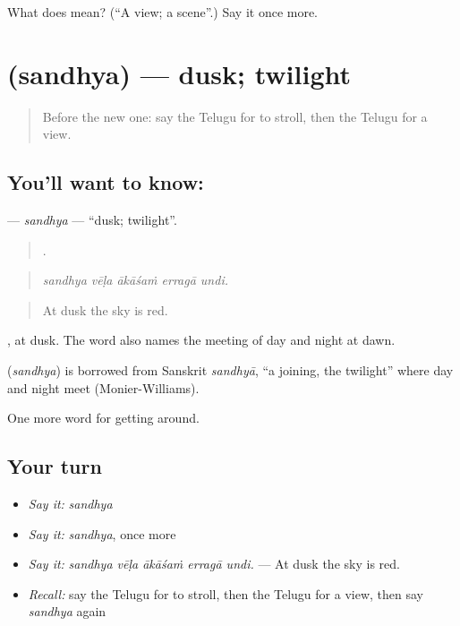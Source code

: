 \begin{tcolorbox}[breakable,colback=teal!4,colframe=teal!35!black,title={Before you move on}]
What does  mean? (\textquotedblleft{}A view; a scene\textquotedblright{}.) Say it once more.
\end{tcolorbox}
\section[\texorpdfstring{\te{సంధ్య} (sandhya)}{సంధ్య (sandhya)}]{ (sandhya) — dusk; twilight}

\label{lesson:TE-C456-sandhya}



\begin{quote}
Before the new one: say the Telugu for to stroll, then the Telugu for a view.
\end{quote}

\subsection*{You'll want to know: }
\textbf{} — \emph{sandhya} — \textquotedblleft{}dusk; twilight\textquotedblright{}.

\begin{quote}
    .
\end{quote}

\begin{quote}
\emph{sandhya vēḷa ākāśaṁ erragā undi.}
\end{quote}

\begin{quote}
At dusk the sky is red.
\end{quote}

 , at dusk. The word also names the meeting of day and night at dawn.

\begin{cousinweb}
\textbf{} (\emph{sandhya}) is borrowed from Sanskrit \emph{sandhyā}, \textquotedblleft{}a joining, the twilight\textquotedblright{} where day and night meet (Monier-Williams).
\end{cousinweb}

\begin{grammarlens}[title={What you've built}]
One more word for getting around.
\end{grammarlens}

\subsection*{Your turn}
\begin{itemize}
\raggedright
  \item \emph{Say it:} \emph{sandhya}
  \item \emph{Say it:} \emph{sandhya}, once more
  \item \emph{Say it:} \emph{sandhya vēḷa ākāśaṁ erragā undi.} — At dusk the sky is red.
  \item \emph{Recall:} say the Telugu for to stroll, then the Telugu for a view, then say \emph{sandhya} again
\end{itemize}

